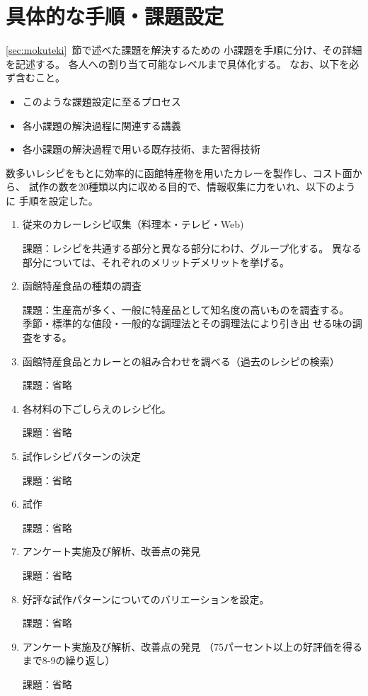 \documentclass[openany,11pt,papersize]{jsbook}
\begin{document}
\section{具体的な手順・課題設定}\label{sec:tejun}
\begin{hissu}
\ref{sec:mokuteki}~節で述べた課題を解決するための
小課題を手順に分け、その詳細を記述する。 
各人への割り当て可能なレベルまで具体化する。
なお、以下を必ず含むこと。 
\begin{itemize}
 \item このような課題設定に至るプロセス　 
 \item 各小課題の解決過程に関連する講義 
 \item 各小課題の解決過程で用いる既存技術、また習得技術
\end{itemize}
\end{hissu}

数多いレシピをもとに効率的に函館特産物を用いたカレーを製作し、コスト面から、 
試作の数を20種類以内に収める目的で、情報収集に力をいれ、以下のように 
手順を設定した。

\begin{enumerate}
\item 従来のカレーレシピ収集（料理本・テレビ・Web)
\par 課題：レシピを共通する部分と異なる部分にわけ、グループ化する。
     異なる部分については、それぞれのメリットデメリットを挙げる。　　

\item 函館特産食品の種類の調査
\par 課題：生産高が多く、一般に特産品として知名度の高いものを調査する。
           季節・標準的な値段・一般的な調理法とその調理法により引き出
           せる味の調査をする。　　
 　 
\item 函館特産食品とカレーとの組み合わせを調べる（過去のレシピの検索）
\par 課題：省略
 　　　 
\item 各材料の下ごしらえのレシピ化。
\par 課題：省略
 　　　 
\item 試作レシピパターンの決定
\par 課題：省略
 　　　 
\item 試作
\par 課題：省略
 　　　 
\item アンケート実施及び解析、改善点の発見
\par 課題：省略

\item 好評な試作パターンについてのバリエーションを設定。　　　
\par 課題：省略
 　　　 
\item アンケート実施及び解析、改善点の発見
（75パーセント以上の好評価を得るまで8-9の繰り返し）
\par 課題：省略
\end{enumerate}
\end{document}
